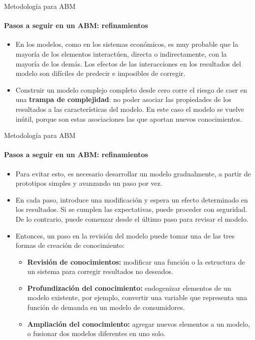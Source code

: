 \documentclass[11pt]{beamer}
\begin{document}
\begin{frame}
\begin{frame}{Metodología para ABM}
\framesubtitle{Pasos a seguir en un ABM: refinamientos}
 \begin{itemize}
     \item  En los modelos, como en los sistemas económicos, es muy probable que la mayoría de los elementos interactúen, directa o indirectamente, con la mayoría de los demás. Los efectos de las interacciones en los resultados del modelo son difíciles de predecir e imposibles de corregir.
\item Construir un modelo complejo completo desde cero corre el riesgo de caer en una \textbf{trampa de complejidad}: no poder asociar las propiedades de los resultados a las características del modelo. En este caso el modelo se vuelve inútil, porque son estas asociaciones las que aportan nuevos conocimientos.
 \end{itemize}  
\end{frame}

\begin{frame}{Metodología para ABM}
\framesubtitle{Pasos a seguir en un ABM: refinamientos}
\begin{itemize}
\small    \item Para evitar esto, es necesario desarrollar un modelo gradualmente, a partir de prototipos simples y avanzando un paso por vez. 
\item En cada paso, introduce una modificación y espera un efecto determinado en los resultados. Si se cumplen las expectativas, puede proceder con seguridad. De lo contrario, puede comenzar desde el último paso para revisar el modelo.\\
\item Entonces, un paso en la revisión del modelo puede tomar una de las tres formas de creación de conocimiento:
\begin{itemize}
\small \item \textbf{Revisión de conocimientos:} modificar una función o la estructura de un sistema para corregir resultados no deseados.
\item \textbf{Profundización del conocimiento:} endogenizar elementos de un modelo existente, por ejemplo, convertir una variable que representa una función de demanda en un modelo de consumidores.
\item \textbf{Ampliación del conocimiento:} agregar nuevos elementos a un modelo, o fusionar dos modelos diferentes en uno solo.
\end{itemize}
\end{itemize}
\end{frame}


\end{frame}
\end{document}
